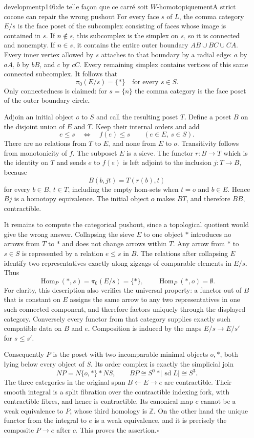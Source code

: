 \begin{dcomment}{development}{p146:de telle façon que ce carré soit $W$-homotopiquement}{A strict cocone can repair the wrong pushout}
For every face $s$ of $L$, the comma category $E/s$ is the face poset of the subcomplex consisting of faces whose image is contained in $s$. If $n\notin s$, this subcomplex is the simplex on $s$, so it is connected and nonempty. If $n\in s$, it contains the entire outer boundary $AB\cup BC\cup CA$. Every inner vertex allowed by $s$ attaches to that boundary by a radial edge: $a$ by $aA$, $b$ by $bB$, and $c$ by $cC$. Every remaining simplex contains vertices of this same connected subcomplex. It follows that
\[
 \pi_0(E/s)=\{*\}\quad\text{for every }s\in S.
\]
Only connectedness is claimed: for $s=\{n\}$ the comma category is the face poset of the outer boundary circle.

Adjoin an initial object $o$ to $S$ and call the resulting poset $T$. Define a poset $B$ on the disjoint union of $E$ and $T$. Keep their internal orders and add
\[
 e\leq s\quad\Longleftrightarrow\quad f(e)\leq s
 \qquad(e\in E,\ s\in S).
\]
There are no relations from $T$ to $E$, and none from $E$ to $o$. Transitivity follows from monotonicity of $f$. The subposet $E$ is a sieve. The functor $r:B\to T$ which is the identity on $T$ and sends $e$ to $f(e)$ is left adjoint to the inclusion $j:T\to B$, because
\[
 B(b,jt)=T(r(b),t)
\]
for every $b\in B$, $t\in T$, including the empty hom-sets when $t=o$ and $b\in E$. Hence $Bj$ is a homotopy equivalence. The initial object $o$ makes $BT$, and therefore $BB$, contractible.

It remains to compute the categorical pushout, since a topological quotient would give the wrong answer. Collapsing the sieve $E$ to one object $*$ introduces no arrows from $T$ to $*$ and does not change arrows within $T$. Any arrow from $*$ to $s\in S$ is represented by a relation $e\leq s$ in $B$. The relations after collapsing $E$ identify two representatives exactly along zigzags of comparable elements in $E/s$. Thus
\[
 \operatorname{Hom}_{P}(*,s)=\pi_0(E/s)=\{*\},
 \qquad \operatorname{Hom}_{P}(*,o)=\emptyset.
\]
For clarity, this description also verifies the universal property: a functor out of $B$ that is constant on $E$ assigns the same arrow to any two representatives in one such connected component, and therefore factors uniquely through the displayed category. Conversely every functor from that category supplies exactly such compatible data on $B$ and $e$. Composition is induced by the maps $E/s\to E/s'$ for $s\leq s'$.

Consequently $P$ is the poset with two incomparable minimal objects $o,*$, both lying below every object of $S$. Its order complex is exactly the simplicial join
\[
 NP=N\{o,*\}*NS,
 \qquad BP\cong S^0*|\operatorname{sd}L|\cong S^3.
\]
The three categories in the original span $B\leftarrow E\to e$ are contractible. Their smooth integral is a split fibration over the contractible indexing fork, with contractible fibres, and hence is contractible. Its canonical map $c$ cannot be a weak equivalence to $P$, whose third homology is $\mathbb Z$. On the other hand the unique functor from the integral to $e$ is a weak equivalence, and it is precisely the composite $P\to e$ after $c$. This proves the assertion.\hfill$\square$


\end{dcomment}
